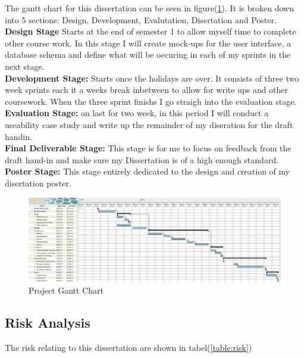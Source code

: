 \documentclass[12pt]{article}  %
\theoremstyle{definition}
\theoremstyle{remark}
\begin{document}
The gantt chart for this dissertation can be seen in figure(\ref{fig:ganttchart}). It is broken down into 5 sections: Design, Development, Evalutation, Disertation and Poster.\\
\textbf{Design Stage} Starts at the end of semester 1 to allow myself time to complete other course work. In this stage I will create mock-ups for the user interface, a database schema and define what will be occuring in each of my sprints in the next stage.\\
\textbf{Development Stage:} Starts once the holidays are over. It consists of three two week sprints each it a weeks break inbetween to allow for write ups and other coursework. When the three sprint finishs I go straigh into the evaluation stage.\\ 
\textbf{Evaluation Stage: } on last for two week, in this period I will conduct a useability case study and write up the remainder of my diseration for the draft handin.\\
\textbf{Final Deliverable Stage:} This stage is for me to focus on feedback from the draft hand-in and make sure my Dissertation is of a high enough standard.\\
\textbf{Poster Stage:} This stage entirely dedicated to the design and creation of my disertation poster.

\begin{figure}[!htbp]

\includegraphics[width=\textwidth]{images/ganttchart.png}
\caption{Project Gantt Chart}
\label{fig:ganttchart}

\end{figure}



\subsection{Risk Analysis}
 
The risk relating to this dissertation are shown in tabel(\ref{table:risk})
\end{document}
